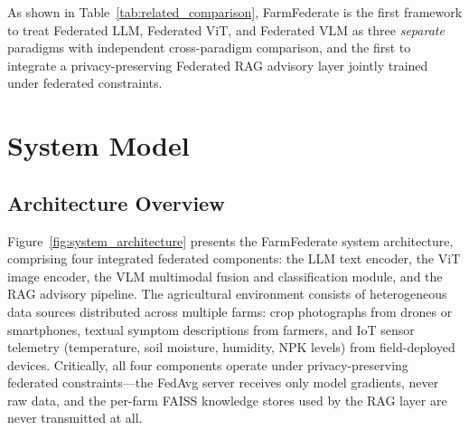 \documentclass[10pt,journal,compsoc]{IEEEtran}
\begin{document}
As shown in Table~\ref{tab:related_comparison}, FarmFederate is the first framework to treat Federated LLM, Federated ViT, and Federated VLM as three \emph{separate} paradigms with independent cross-paradigm comparison, and the first to integrate a privacy-preserving Federated RAG advisory layer jointly trained under federated constraints.

\section{System Model}
\label{sec:system}

\subsection{Architecture Overview}

Figure~\ref{fig:system_architecture} presents the FarmFederate system architecture, comprising four integrated federated components: the LLM text encoder, the ViT image encoder, the VLM multimodal fusion and classification module, and the RAG advisory pipeline. The agricultural environment consists of heterogeneous data sources distributed across multiple farms: crop photographs from drones or smartphones, textual symptom descriptions from farmers, and IoT sensor telemetry (temperature, soil moisture, humidity, NPK levels) from field-deployed devices. Critically, all four components operate under privacy-preserving federated constraints---the FedAvg server receives only model gradients, never raw data, and the per-farm FAISS knowledge stores used by the RAG layer are never transmitted at all.
\end{document}

